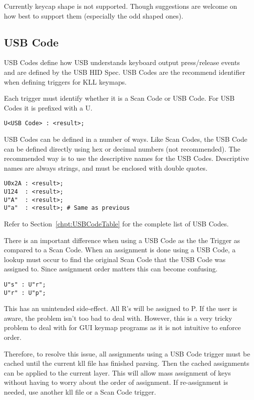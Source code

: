\documentclass{kiibohd-template}
\begin{document}
Currently keycap shape is not supported.
Though suggestions are welcome on how best to support them (especially the odd shaped ones).


\subsection{USB Code}
\label{subsec:USB_Code}

USB Codes define how USB understands keyboard output press/release events and are defined by the USB HID Spec.
USB Codes are the recommend identifier when defining triggers for KLL keymaps.

Each trigger must identify whether it is a Scan Code or USB Code.
For USB Codes it is prefixed with a U.

\begin{lstlisting}
U<USB Code> : <result>;
\end{lstlisting}

USB Codes can be defined in a number of ways.
Like Scan Codes, the USB Code can be defined directly using hex or decimal numbers (not recommended).
The recommended way is to use the descriptive names for the USB Codes.
Descriptive names are always strings, and must be enclosed with double quotes.

\begin{lstlisting}
U0x2A : <result>;
U124  : <result>;
U"A"  : <result>;
U"a"  : <result>; # Same as previous
\end{lstlisting}

Refer to Section~\ref{chpt:USBCodeTable} for the complete list of USB Codes.

There is an important difference when using a USB Code as the the Trigger as compared to a Scan Code.
When an assignment is done using a USB Code, a lookup must occur to find the original Scan Code that the USB Code was assigned to.
Since assignment order matters this can become confusing.

\begin{lstlisting}
U"s" : U"r";
U"r" : U"p";
\end{lstlisting}

This has an unintended side-effect.
All R's will be assigned to P.
If the user is aware, the problem isn't too bad to deal with.
However, this is a very tricky problem to deal with for GUI keymap programs as it is not intuitive to enforce order.

Therefore, to resolve this issue, all assignments using a USB Code trigger must be cached until the current kll file has finished parsing.
Then the cached assignments can be applied to the current layer.
This will allow mass assignment of keys without having to worry about the order of assignment.
If re-assignment is needed, use another kll file or a Scan Code trigger.
\end{document}
